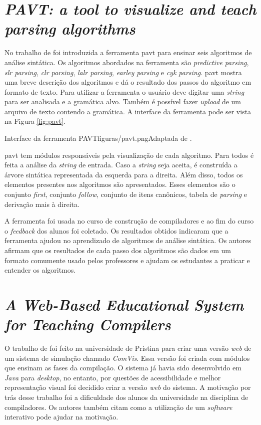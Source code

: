 \section{\textit{PAVT: a tool to visualize and teach parsing algorithms}}
No trabalho de \textcite{sangal2018pavt} foi introduzida a ferramenta \gls{pavt} para ensinar seis algoritmos de análise sintática. Os algoritmos abordados na ferramenta são \textit{predictive parsing}, \textit{\gls{slr} parsing}, \textit{\gls{clr} parsing}, \textit{\gls{lalr} parsing}, \textit{earley parsing} e \textit{\gls{cyk} parsing}. \gls{pavt} mostra uma breve descrição dos algoritmos e dá o resultado dos passos do algoritmo em formato de texto. Para utilizar a ferramenta o usuário deve digitar uma \textit{string} para ser analisada e a gramática alvo. Também é possível fazer \textit{upload} de um arquivo de texto contendo a gramática. A interface da ferramenta pode ser vista na Figura \ref{fig:pavt}.



\begin{mypicture}{\label{fig:pavt}}{Interface da ferramenta PAVT}{figuras/pavt.png}{Adaptada de \textcite{pavt}.}
\end{mypicture}

\gls{pavt} tem módulos responsáveis pela visualização de cada algoritmo. Para todos é feita a análise da \textit{string} de entrada. Caso a \textit{string} seja aceita, é construída a árvore sintática representada da esquerda para a direita. Além disso, todos os elementos presentes nos algoritmos são apresentados. Esses elementos são o conjunto \textit{first}, conjunto \textit{follow}, conjunto de itens canônicos, tabela de \textit{parsing} e derivação mais à direita.

A ferramenta foi usada no curso de construção de compiladores e ao fim do curso o \textit{feedback} dos alunos foi coletado. Os resultados obtidos indicaram que a ferramenta ajudou no aprendizado de algoritmos de análise sintática. Os autores afirmam que os resultados de cada passo dos algoritmos são dados em um formato comumente usado pelos professores e ajudam os estudantes a praticar e entender os algoritmos.

\section{\textit{A Web-Based Educational System for Teaching Compilers}}
O trabalho de \textcite{webbased} foi feito na universidade de Pristina para criar uma versão \textit{web} de um sistema de simulação chamado \textit{ComVis}. Essa versão foi criada com módulos que ensinam as fases da compilação. O sistema já havia sido desenvolvido em \textit{Java} para \textit{desktop}, no entanto, por questões de acessibilidade e melhor representação visual foi decidido criar a versão \textit{web} do sistema. A motivação por trás desse trabalho foi a dificuldade dos alunos da universidade na disciplina de compiladores. Os autores também citam como a utilização de um \textit{software} interativo pode ajudar na motivação.

